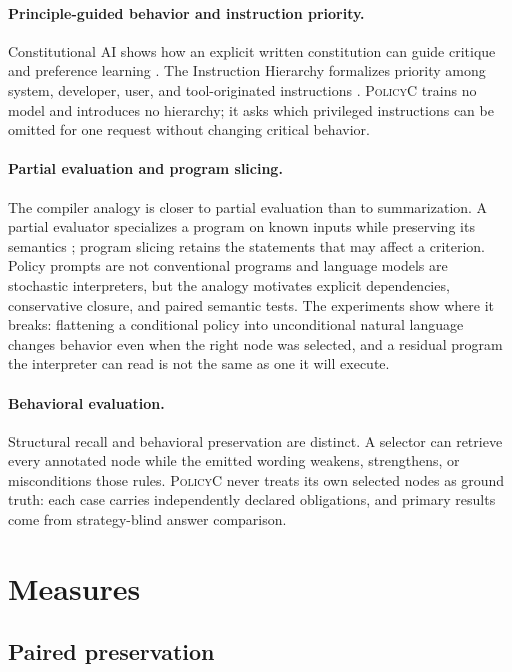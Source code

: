 \documentclass[11pt]{article}
\newcommand{\policyc}{\textsc{PolicyC}\xspace}
\begin{document}
\paragraph{Principle-guided behavior and instruction priority.}
Constitutional AI shows how an explicit written constitution can guide critique and preference learning \cite{constitutional}. The Instruction Hierarchy formalizes priority among system, developer, user, and tool-originated instructions \cite{instructionhierarchy}. \policyc trains no model and introduces no hierarchy; it asks which privileged instructions can be omitted for one request without changing critical behavior.

\paragraph{Partial evaluation and program slicing.}
The compiler analogy is closer to partial evaluation than to summarization. A partial evaluator specializes a program on known inputs while preserving its semantics \cite{partialevaluation}; program slicing retains the statements that may affect a criterion. Policy prompts are not conventional programs and language models are stochastic interpreters, but the analogy motivates explicit dependencies, conservative closure, and paired semantic tests. The experiments show where it breaks: flattening a conditional policy into unconditional natural language changes behavior even when the right node was selected, and a residual program the interpreter can read is not the same as one it will execute.

\paragraph{Behavioral evaluation.}
Structural recall and behavioral preservation are distinct. A selector can retrieve every annotated node while the emitted wording weakens, strengthens, or misconditions those rules. \policyc never treats its own selected nodes as ground truth: each case carries independently declared obligations, and primary results come from strategy-blind answer comparison.

\section{Measures}
\label{sec:measures}

\subsection{Paired preservation}
\end{document}
